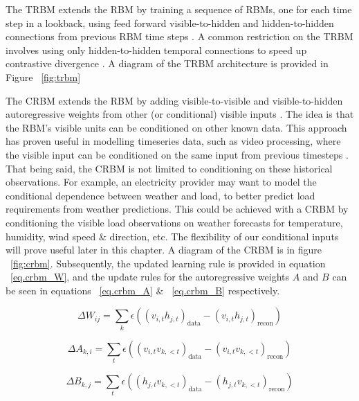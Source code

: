 The \ac{TRBM} extends the \ac{RBM} by training a sequence of \acp{RBM}, 
one for each time step in a lookback, using feed forward visible-to-hidden 
and hidden-to-hidden connections from previous \ac{RBM} time steps \citep{trbm}. 
A common restriction on the \ac{TRBM} involves using only hidden-to-hidden 
temporal connections to speed up contrastive divergence \citep{trbm-restricted}. 
A diagram of the \ac{TRBM} architecture is provided in Figure ~\ref{fig:trbm}

The \ac{CRBM} extends the \ac{RBM} by adding visible-to-visible and visible-to-hidden
autoregressive weights from other (or conditional) visible inputs \citep{crbm-2007}.
The idea is that the \ac{RBM}'s visible units can be conditioned on other known data.
This approach has proven useful in modelling timeseries data, such as video processing, 
where the visible input can be conditioned on the same input from 
previous timesteps \citep{crbm-2007}.
That being said, the \ac{CRBM} is not limited to conditioning on these historical observations.
For example, an electricity provider may want to model the conditional dependence between 
weather and load, to better predict load requirements from weather predictions.
This could be achieved with a \ac{CRBM} by conditioning the visible load observations on 
weather forecasts for temperature, humidity, wind speed \& direction, etc.
The flexibility of our conditional inputs will prove useful later in this chapter.
A diagram of the \ac{CRBM} is in figure ~\ref{fig:crbm}. 
Subsequently, the updated learning rule is provided in 
equation ~\ref{eq.crbm_W}, and the update rules for the autoregressive 
weights $A$ and $B$ can be seen in equations ~\ref{eq.crbm_A} 
\& ~\ref{eq.crbm_B} respectively.

\begin{equation}
\Delta W_{ij} = \sum_{k} \epsilon((v_{i,t}h_{j,t})_{\mathrm{data}} - (v_{i,t}h_{j,t})_{\mathrm{recon}}) \label{eq.crbm_W}
\end{equation}

\begin{equation}
\Delta A_{k,i} = \sum_{t} \epsilon((v_{i,t}v_{k,<t})_{\mathrm{data}} - (v_{i,t}v_{k,<t})_{\mathrm{recon}}) \label{eq.crbm_A}
\end{equation}

\begin{equation}
\Delta B_{k,j} = \sum_{t} \epsilon((h_{j,t}v_{k,<t})_{\mathrm{data}} - (h_{j,t}v_{k,<t})_{\mathrm{recon}}) \label{eq.crbm_B}
\end{equation}

